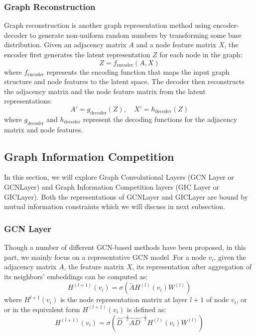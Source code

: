 \documentclass[conference]{IEEEtran}
\begin{document}
\subsubsection{Graph Reconstruction} Graph reconstruction \cite{Kipf2016VariationalGA} \cite{Winter2021PermutationInvariantVA} is another graph representation method using encoder-decoder to generate non-uniform random numbers by transforming some base distribution.
Given an adjacency matrix $A$ and a node feature matrix $X$, the encoder first generates the latent representation $Z$ for each node in the graph:
\begin{equation}
\label{graph-encoder-form1}
Z = f_{\text{encoder}}(A, X)
\end{equation}
where $f_{\text{encoder}}$ represents the encoding function that maps the input graph structure and node features to the latent space.
The decoder then reconstructs the adjacency matrix and the node feature matrix from the latent representations:
\begin{equation}
\label{graph-encoder-form2}
A' = g_{\text{decoder}}(Z), \quad X' = h_{\text{decoder}}(Z)
\end{equation}
where $g_{\text{decoder}}$ and $h_{\text{decoder}}$ represent the decoding functions for the adjacency matrix and node features.

\subsection{Graph Information Competition}

In this section, we will explore Graph Convolutional Layers (GCN Layer or GCNLayer) and Graph Information Competition layers (GIC Layer or GICLayer). Both the representations of GCNLayer and GICLayer are bound by mutual information constraints which we will discuss in next subsection.

\subsubsection{GCN Layer} 
\label{section:gcnlayers}
Though a number of different GCN-based methods have been proposed, in this part, we mainly focus on a representative GCN model \cite{kipf2017semi}.For a node $v_i$, given the adjacency matrix $A$, the feature matrix $X$, its representation after aggregation of its neighbors' embeddings can be computed as:
\begin{equation}
\label{gcn-form1}
H^{(l+1)} (v_i)= \sigma(\tilde{A}H^{(l)}(v_i)W^{(l)}) 
\end{equation}
where $H^{l+1}(v_i)$ is the node representation matrix at layer $l+1$ of node $v_i$, or or in the equivalent form $H^{(l+1)}(v_i)$ is defined as:
\begin{equation}
\label{gcn-form2}
H^{(l+1)}(v_i) = \sigma(\hat{D}^{-\frac{1}{2}}\hat{A}\hat{D}^{-\frac{1}{2}}H^{(l)}(v_i)W^{(l)})
\end{equation}
\end{document}

